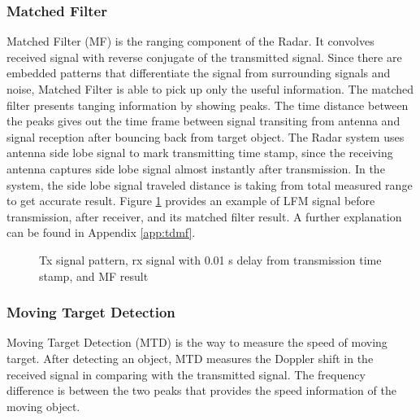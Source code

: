 \documentclass[letterpaper, 12 pt, conference]{report}
\numberwithin{figure}{section}
\begin{document}
\subsubsection{Matched Filter}
Matched Filter (MF) is the ranging component of the Radar. It convolves received signal with reverse conjugate of the transmitted signal. Since there are embedded patterns that differentiate the signal from surrounding signals and noise, Matched Filter is able to pick up only the useful information. The matched filter presents tanging information by showing peaks. The time distance between the peaks gives out the time frame between signal transiting from antenna and signal reception after bouncing back from target object. The Radar system uses antenna side lobe signal to mark transmitting time stamp, since the receiving antenna captures side lobe signal almost instantly after transmission. In the system, the side lobe signal traveled distance is taking from total measured range to get accurate result. Figure \ref{fig:mfex} provides an example of LFM signal before transmission, after receiver, and its matched filter result. A further explanation can be found in Appendix \ref{app:tdmf}.
\begin{figure}[h]
\centering{}
\caption{Tx signal pattern, rx signal with 0.01 s delay from transmission time stamp, and MF result}
\label{fig:mfex}
\end{figure}
\FloatBarrier
\subsubsection{Moving Target Detection}
Moving Target Detection (MTD) is the way to measure the speed of moving target. After detecting an object, MTD measures the Doppler shift in the received signal in comparing with the transmitted signal. The frequency difference is between the two peaks that provides the speed information of the moving object.
\end{document}
